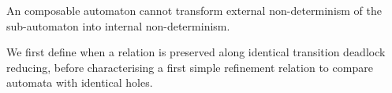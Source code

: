\documentclass[runningheads]{llncs}
\begin{document}
An composable automaton cannot transform external non-determinism of the sub-automaton into internal non-determinism.



%
%




We first define when a relation is preserved along identical transition deadlock reducing, before characterising a first simple refinement relation  to compare automata with identical holes.
\end{document}
